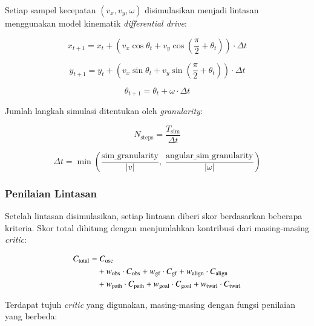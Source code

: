 Setiap sampel kecepatan $(v_x, v_y, \omega)$ disimulasikan menjadi
lintasan menggunakan model kinematik \emph{differential drive}:

\begin{equation}
x_{t+1} = x_t + \left(v_x \cos\theta_t + v_y \cos\left(\frac{\pi}{2}
+ \theta_t\right)\right) \cdot \Delta t
\end{equation}

\begin{equation}
y_{t+1} = y_t + \left(v_x \sin\theta_t + v_y \sin\left(\frac{\pi}{2}
+ \theta_t\right)\right) \cdot \Delta t
\end{equation}

\begin{equation}
\theta_{t+1} = \theta_t + \omega \cdot \Delta t
\end{equation}

Jumlah langkah simulasi ditentukan oleh \emph{granularity}:

\begin{equation}
N_{\text{steps}} = \frac{T_{\text{sim}}}{\Delta t}
\end{equation}

\begin{equation}
\Delta t = \min\left(\frac{\text{sim\_granularity}}{|v|},\;
\frac{\text{angular\_sim\_granularity}}{|\omega|}\right)
\end{equation}

\subsubsection{Penilaian Lintasan}

Setelah lintasan disimulasikan, setiap lintasan diberi skor
berdasarkan beberapa kriteria. Skor total dihitung dengan
menjumlahkan kontribusi dari masing-masing \emph{critic}:

\begin{align}
C_{\text{total}} = &\; C_{\text{osc}} \notag \\
&+ w_{\text{obs}} \cdot C_{\text{obs}}
+ w_{\text{gf}} \cdot C_{\text{gf}}
+ w_{\text{align}} \cdot C_{\text{align}} \notag \\
&+ w_{\text{path}} \cdot C_{\text{path}}
+ w_{\text{goal}} \cdot C_{\text{goal}}
+ w_{\text{twirl}} \cdot C_{\text{twirl}}
\end{align}

Terdapat tujuh \emph{critic} yang digunakan, masing-masing dengan
fungsi penilaian yang berbeda:


